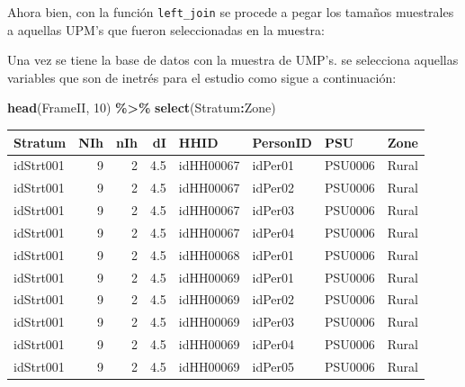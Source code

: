 \documentclass[
  spanish,
  12pt,
]{book}
\newenvironment{Shaded}{\begin{snugshade}}{\end{snugshade}}
\newcommand{\DecValTok}[1]{\textcolor[rgb]{0.00,0.00,0.81}{#1}}
\newcommand{\FunctionTok}[1]{\textcolor[rgb]{0.13,0.29,0.53}{\textbf{#1}}}
\newcommand{\NormalTok}[1]{#1}
\newcommand{\OtherTok}[1]{\textcolor[rgb]{0.56,0.35,0.01}{#1}}
\newcommand{\SpecialCharTok}[1]{\textcolor[rgb]{0.81,0.36,0.00}{\textbf{#1}}}
\begin{document}
\begin{Shaded}
\end{Shaded}

Ahora bien, con la función \texttt{left\_join} se procede a pegar los tamaños muestrales a aquellas UPM's que fueron seleccionadas en la muestra:

\begin{Shaded}
\end{Shaded}

Una vez se tiene la base de datos con la muestra de UMP's. se selecciona aquellas variables que son de inetrés para el estudio como sigue a continuación:

\begin{Shaded}
\begin{Highlighting}[]
\FunctionTok{head}\NormalTok{(FrameII, }\DecValTok{10}\NormalTok{) }\SpecialCharTok{\%\textgreater{}\%} \FunctionTok{select}\NormalTok{(Stratum}\SpecialCharTok{:}\NormalTok{Zone)}
\end{Highlighting}
\end{Shaded}

\begin{tabular}{l|r|r|r|l|l|l|l}
\hline
Stratum & NIh & nIh & dI & HHID & PersonID & PSU & Zone\\
\hline
idStrt001 & 9 & 2 & 4.5 & idHH00067 & idPer01 & PSU0006 & Rural\\
\hline
idStrt001 & 9 & 2 & 4.5 & idHH00067 & idPer02 & PSU0006 & Rural\\
\hline
idStrt001 & 9 & 2 & 4.5 & idHH00067 & idPer03 & PSU0006 & Rural\\
\hline
idStrt001 & 9 & 2 & 4.5 & idHH00067 & idPer04 & PSU0006 & Rural\\
\hline
idStrt001 & 9 & 2 & 4.5 & idHH00068 & idPer01 & PSU0006 & Rural\\
\hline
idStrt001 & 9 & 2 & 4.5 & idHH00069 & idPer01 & PSU0006 & Rural\\
\hline
idStrt001 & 9 & 2 & 4.5 & idHH00069 & idPer02 & PSU0006 & Rural\\
\hline
idStrt001 & 9 & 2 & 4.5 & idHH00069 & idPer03 & PSU0006 & Rural\\
\hline
idStrt001 & 9 & 2 & 4.5 & idHH00069 & idPer04 & PSU0006 & Rural\\
\hline
idStrt001 & 9 & 2 & 4.5 & idHH00069 & idPer05 & PSU0006 & Rural\\
\hline
\end{tabular}
\end{document}

